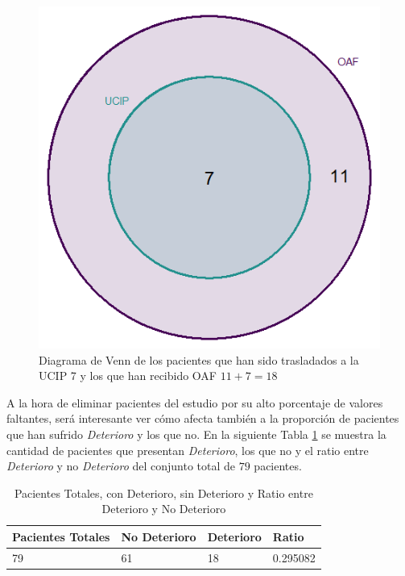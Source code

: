 \begin{figure}[H]
    \centering
    \includegraphics[scale = 1.50]{./img/venn-diagram-OAF-UCIP.png}
    \caption{Diagrama de Venn de los pacientes que han sido trasladados a la UCIP 7 y los que han recibido OAF $11 + 7 = 18$}
    \label{fig:venn-OAF-UCIP}
\end{figure}


A la hora de eliminar pacientes del estudio por su alto porcentaje de valores faltantes, será interesante ver cómo afecta también a la proporción de pacientes que han sufrido \textit{Deterioro} y los que no. En la siguiente Tabla \ref{tabla:ratio-deterioro} se muestra la cantidad de pacientes que presentan \textit{Deterioro}, los que no y el ratio entre \textit{Deterioro} y no \textit{Deterioro} del conjunto total de $79$ pacientes.

\begin{table}[H]
    \centering
    \begin{tabular}{|m{2cm}|m{2.25cm}|m{2cm}|m{2cm}|}
    \hline
        Pacientes Totales & No Deterioro & Deterioro & Ratio \\ \hline
        79 & 61 & 18 & 0.295082 \\ \hline
    \end{tabular}
    \caption{Pacientes Totales, con Deterioro, sin Deterioro y Ratio entre Deterioro y No Deterioro}
        \label{tabla:ratio-deterioro}
\end{table}

